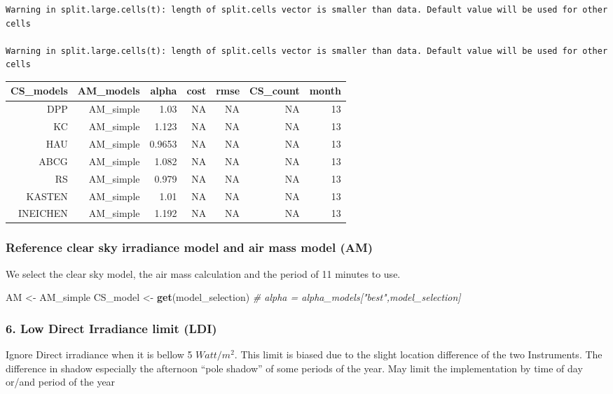 \documentclass[
  10pt,
  a4paper,oneside]{article}
\newenvironment{Shaded}{\begin{snugshade}}{\end{snugshade}}
\newcommand{\CommentTok}[1]{\textcolor[rgb]{0.56,0.35,0.01}{\textit{#1}}}
\newcommand{\KeywordTok}[1]{\textcolor[rgb]{0.13,0.29,0.53}{\textbf{#1}}}
\newcommand{\NormalTok}[1]{#1}
\newcommand{\StringTok}[1]{\textcolor[rgb]{0.31,0.60,0.02}{#1}}
\begin{document}
\begin{verbatim}
Warning in split.large.cells(t): length of split.cells vector is smaller than data. Default value will be used for other cells

Warning in split.large.cells(t): length of split.cells vector is smaller than data. Default value will be used for other cells
\end{verbatim}

\begin{longtable}[]{@{}rrrrrrr@{}}
\toprule
CS\_models & AM\_models & alpha & cost & rmse & CS\_count & month\tabularnewline
\midrule
\endhead
DPP & AM\_simple & 1.03 & NA & NA & NA & 13\tabularnewline
KC & AM\_simple & 1.123 & NA & NA & NA & 13\tabularnewline
HAU & AM\_simple & 0.9653 & NA & NA & NA & 13\tabularnewline
ABCG & AM\_simple & 1.082 & NA & NA & NA & 13\tabularnewline
RS & AM\_simple & 0.979 & NA & NA & NA & 13\tabularnewline
KASTEN & AM\_simple & 1.01 & NA & NA & NA & 13\tabularnewline
INEICHEN & AM\_simple & 1.192 & NA & NA & NA & 13\tabularnewline
\bottomrule
\end{longtable}

\hypertarget{reference-clear-sky-irradiance-model-and-air-mass-model-am}{%
\subsubsection{Reference clear sky irradiance model and air mass model (AM)}\label{reference-clear-sky-irradiance-model-and-air-mass-model-am}}

We select the clear sky model, the air mass calculation
and the period of 11
minutes to use.

\begin{Shaded}
\begin{Highlighting}[]
\NormalTok{AM       \textless{}{-}}\StringTok{ }\NormalTok{AM\_simple}
\NormalTok{CS\_model \textless{}{-}}\StringTok{ }\KeywordTok{get}\NormalTok{(model\_selection)}
\CommentTok{\# alpha    = alpha\_models["best",model\_selection]}
\end{Highlighting}
\end{Shaded}

\hypertarget{low-direct-irradiance-limit-ldi}{%
\subsubsection{6. Low Direct Irradiance limit (LDI)}\label{low-direct-irradiance-limit-ldi}}

Ignore Direct irradiance when it is bellow 5 \(Watt/m^2\).
This limit is biased due to the slight location difference of the two Instruments.
The difference in shadow especially the afternoon ``pole shadow'' of some periods of the year.
May limit the implementation by time of day or/and period of the year
\end{document}
